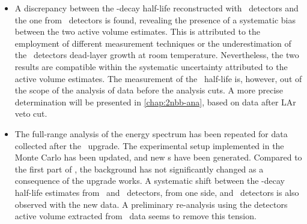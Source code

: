 \begin{itemize}
  \item A discrepancy between the \nnbb-decay half-life reconstructed with \bege\
    detectors and the one from \scoax\ detectors is found, revealing the presence of a
    systematic bias between the two active volume estimates. This is attributed to the
    employment of different measurement techniques or the underestimation of the \bege\
    detectors dead-layer growth at room temperature. Nevertheless, the two results are
    compatible within the systematic uncertainty attributed to the active volume
    estimates. The measurement of the \nnbb\ half-life is, however, out of the scope of
    the analysis of data before the analysis cuts. A more precise determination will be
    presented in \cref{chap:2nbb-ana}, based on data after LAr veto cut.
  \item The full-range analysis of the energy spectrum has been repeated for data
    collected after the \phasetwop\ upgrade. The experimental setup implemented in the
    Monte Carlo has been updated, and new \pdf{}s have been generated. Compared to the first
    part of \phasetwo, the background has not significantly changed as a consequence of
    the upgrade works. A systematic shift between the \nnbb-decay half-life estimates from
    \scoax\ and \icoax\ detectors, from one side, and \bege\ detectors is also observed
    with the new data. A preliminary re-analysis using the detectors active volume
    extracted from \Arl\ data seems to remove this tension.
\end{itemize}

